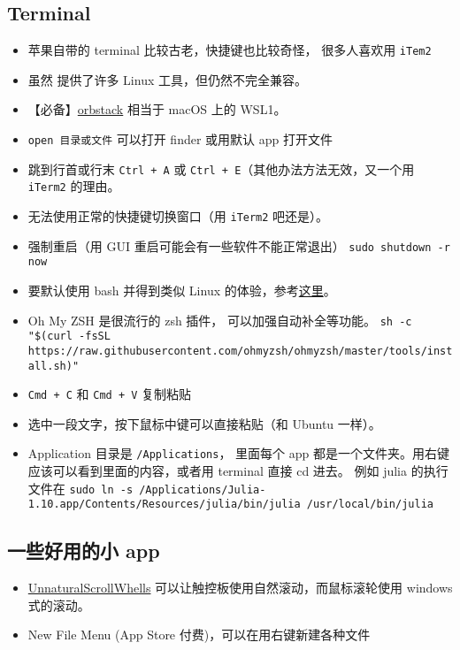 \subsection{Terminal}
\begin{itemize}
\item 苹果自带的 terminal 比较古老，快捷键也比较奇怪， 很多人喜欢用 \verb`iTem2`
\item 虽然  提供了许多 Linux 工具，但仍然不完全兼容。
\item 【必备】\href{https://orbstack.dev/}{orbstack} 相当于 macOS 上的 WSL1。
\item \verb`open 目录或文件` 可以打开 finder 或用默认 app 打开文件
\item 跳到行首或行末 \verb`Ctrl + A` 或 \verb`Ctrl + E`（其他办法方法无效，又一个用 \verb`iTerm2` 的理由。
\item 无法使用正常的快捷键切换窗口（用 \verb`iTerm2` 吧还是）。
\item 强制重启（用 GUI 重启可能会有一些软件不能正常退出） \verb|sudo shutdown -r now|
\item 要默认使用 bash 并得到类似 Linux 的体验，参考\href{https://medium.com/@geraldcroes/the-good-tweak-the-bad-mac-and-the-ugly-terminal-8f18b3c3d687}{这里}。
\item Oh My ZSH 是很流行的 zsh 插件， 可以加强自动补全等功能。 \verb`sh -c "$(curl -fsSL https://raw.githubusercontent.com/ohmyzsh/ohmyzsh/master/tools/install.sh)"`
\item \verb`Cmd + C` 和 \verb`Cmd + V` 复制粘贴
\item 选中一段文字，按下鼠标中键可以直接粘贴（和 Ubuntu 一样）。
\item Application 目录是 \verb`/Applications`， 里面每个 app 都是一个文件夹。用右键应该可以看到里面的内容，或者用 terminal 直接 cd 进去。 例如 julia 的执行文件在 \verb`sudo ln -s /Applications/Julia-1.10.app/Contents/Resources/julia/bin/julia /usr/local/bin/julia`
\end{itemize}

\subsection{一些好用的小 app}
\begin{itemize}
\item \href{https://github.com/ther0n/UnnaturalScrollWheels}{UnnaturalScrollWhells} 可以让触控板使用自然滚动，而鼠标滚轮使用 windows 式的滚动。
\item New File Menu (App Store 付费)，可以在用右键新建各种文件
\end{itemize}

